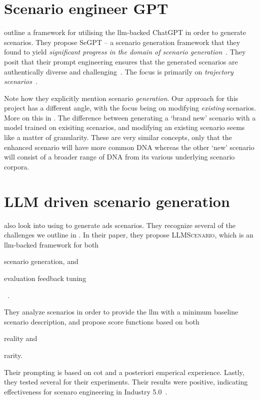 \section{Scenario engineer GPT}

\citeauthor{seGpt} outline a framework for utilising the \acrshort{llm}-backed ChatGPT in order to
generate scenarios. They propose SeGPT -- a scenario generation framework that they found to yield
\textit{significant progress in the domain of scenario generation}~\cite[4422]{seGpt}. They posit
that their prompt engineering ensures that the generated scenarios are authentically diverse and
challenging~\cite[4423]{seGpt}. The focus is primarily on \textit{trajectory
    scenarios}~\cite[4422-4423]{seGpt}.

Note how they explicitly mention scenario \textit{generation}. Our approach for this project has a
different angle, with the focus being on modifying \textit{existing} scenarios. More on this in
. The difference between generating a `brand new' scenario with a model
trained on exisiting scenarios, and modifying an existing scenario seems like a matter of
granularity. These are very similar concepts, only that the enhanced scenario will have more common
DNA whereas the other `new' scenario will consist of a broader range of DNA from its various
underlying scenario corpora.

\section{LLM driven scenario generation}\label{sec:rwChang24}

\citeauthor{LLMScenarioChang24} also look into using  to generate \acrshort{ads}
scenarios. They recognize several of the challenges we outline in . In
their \citeyear{LLMScenarioChang24} paper, they propose \textsc{LLMScenario}, which is an
\acrshort{llm}-backed framework for both \begin{inparaenum}
    \item scenario generation, and
    \item  evaluation feedback tuning
\end{inparaenum}~\cite[6581]{LLMScenarioChang24}.

They analyze scenarios in order to provide the \acrshort{llm} with a minimum baseline scenario
description, and propose score functions based on both \begin{inparaenum}
    \item reality and
    \item rarity.
\end{inparaenum} Their prompting is based on \acrfull{cot} and a posteriori emperical experience.
Lastly, they tested several  for their experiments. Their results were positive,
indicating effectiveness for scenaro engineering in Industry 5.0~\cite[6581]{LLMScenarioChang24}.

